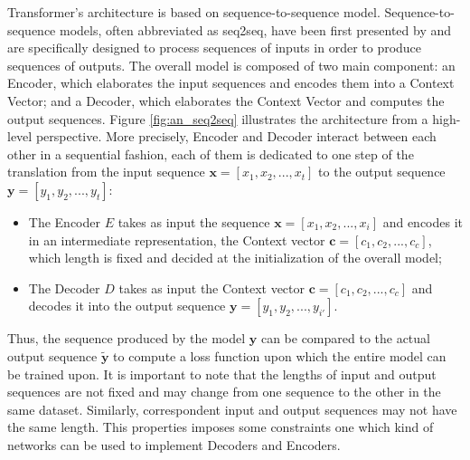             Transformer's architecture is based on sequence-to-sequence model. Sequence-to-sequence models, often abbreviated as seq2seq, have been first presented by  and are specifically designed to process sequences of inputs in order to produce sequences of outputs. The overall model is composed of two main component: an Encoder, which elaborates the input sequences and encodes them into a Context Vector; and a Decoder, which elaborates the Context Vector and computes the output sequences. Figure \ref{fig:an_seq2seq} illustrates the architecture from a high-level perspective.\newline
            More precisely, Encoder and Decoder interact between each other in a sequential fashion, each of them is dedicated to one step of the translation from the input sequence $\mathbf{x} = [x_1, x_2, ..., x_t]$ to the output sequence $\mathbf{y} = \left[y_1, y_2, ..., y_t \right]$:
            \begin{itemize}[topsep=0.5em, partopsep=0.5em]
                \setlength\itemsep{0em}
                \item The Encoder $E$ takes as input the sequence $\mathbf{x} = [x_1, x_2, ..., x_i]$ and encodes it in an intermediate representation, the Context vector $\mathbf{c} = [ c_1, c_2, ..., c_c]$, which length is fixed and decided at the initialization of the overall model;
                \item The Decoder $D$ takes as input the Context vector $\mathbf{c} = [ c_1, c_2, ..., c_c]$ and decodes it into the output sequence $\mathbf{y} = \left[y_1, y_2, ..., y_{i'} \right]$.
            \end{itemize}
            
            Thus, the sequence produced by the model $\mathbf{y}$ can be compared to the actual output sequence $\mathbf{\tilde{y}}$ to compute a loss function upon which the entire model can be trained upon. \newline
            It is important to note that the lengths of input and output sequences are not fixed and may change from one sequence to the other in the same dataset. Similarly, correspondent input and output sequences may not have the same length. This properties imposes some constraints one which kind of networks can be used to implement Decoders and Encoders.
            

